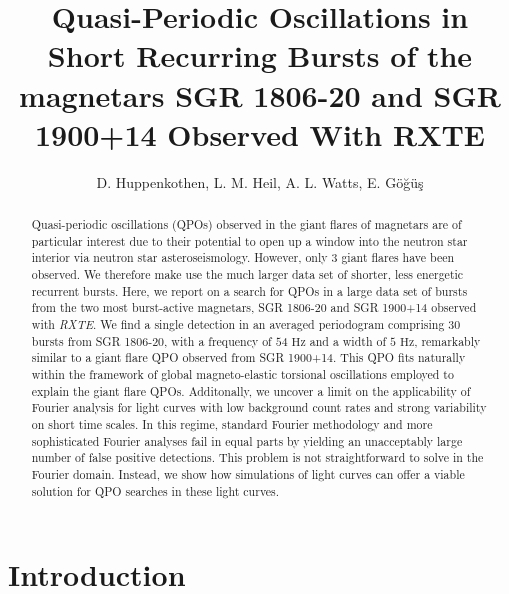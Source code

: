 \documentclass[numberedappendix]{emulateapj}
\newcommand{\hz}{\,\mathrm{Hz}}
\newcommand{\project}[1]{\textsl{#1}}
\newcommand{\rxte}{\project{RXTE}}
\begin{document}
\title{Quasi-Periodic Oscillations in Short Recurring Bursts of the magnetars SGR 1806-20 and SGR 1900+14 Observed With RXTE}

\author{D. Huppenkothen, L. M. Heil, A. L. Watts,  E. G{\"o}{\u g}{\"u}{\c s}}

 


\begin{abstract}

Quasi-periodic oscillations (QPOs) observed in the giant flares of magnetars are of particular interest due to their potential to open up
a window into the neutron star interior via neutron star asteroseismology. However, only $3$ giant flares have been observed. We
therefore make use the much larger data set of shorter, less energetic recurrent bursts. Here, we report on a search for QPOs in a large data set of bursts from
the two most burst-active magnetars, SGR 1806-20 and SGR 1900+14 observed with \rxte. We find a single detection in an averaged periodogram 
comprising $30$ bursts from SGR 1806-20, with a frequency of $54\,\hz$ and a width of $5\,\hz$, remarkably similar to a giant flare
QPO observed from SGR 1900+14. This QPO fits naturally within the framework of global magneto-elastic torsional oscillations 
employed to explain the giant flare QPOs. Additonally, we uncover a limit on the applicability of Fourier analysis for light curves 
with low background count rates and strong variability on short time scales. In this regime, standard Fourier methodology and
more sophisticated Fourier analyses fail in equal parts by yielding an unacceptably large number of false positive detections. 
This problem is not straightforward to solve in the Fourier domain. Instead, we show how simulations of light curves can offer
a viable solution for QPO searches in these light curves.

\end{abstract}




\section{Introduction}
\end{document}
